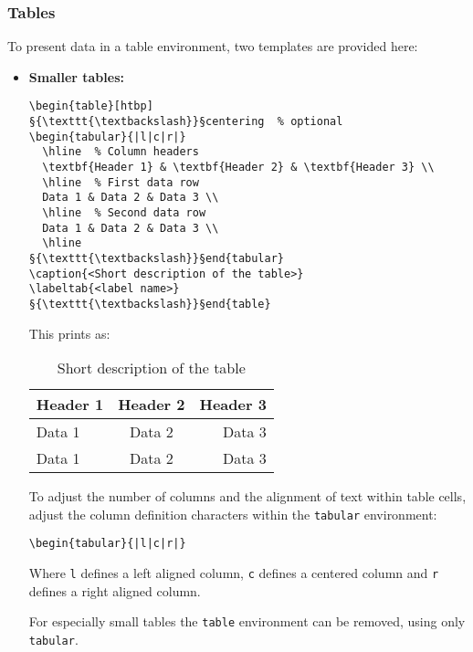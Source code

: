\subsubsection{Tables}

To present data in a table environment, two templates are provided here:

\begin{itemize}
\item \textbf{Smaller tables:}
\begin{lstlisting}[style=LaTeXStyle]
\begin{table}[htbp]
§{\texttt{\textbackslash}}§centering  % optional
\begin{tabular}{|l|c|r|}
  \hline  % Column headers
  \textbf{Header 1} & \textbf{Header 2} & \textbf{Header 3} \\
  \hline  % First data row
  Data 1 & Data 2 & Data 3 \\
  \hline  % Second data row
  Data 1 & Data 2 & Data 3 \\
  \hline
§{\texttt{\textbackslash}}§end{tabular}
\caption{<Short description of the table>}
\labeltab{<label name>}
§{\texttt{\textbackslash}}§end{table}
\end{lstlisting}
This prints as:
\begin{table}[htbp]
\centering  %
\begin{tabular}{|l|c|r|}
  \hline  %
  \textbf{Header 1} & \textbf{Header 2} & \textbf{Header 3} \\
  \hline  %
  Data 1 & Data 2 & Data 3 \\
  \hline  %
  Data 1 & Data 2 & Data 3 \\
  \hline
\end{tabular}
\caption{Short description of the table}
\end{table}

To adjust the number of columns and the alignment of text within table cells, adjust the column definition characters within the \texttt{tabular} environment:
\begin{lstlisting}[style=LaTeXStyle]
\begin{tabular}{|l|c|r|}
\end{lstlisting}
Where \texttt{l} defines a left aligned column, \texttt{c} defines a centered column and \texttt{r} defines a right aligned column.

For especially small tables the \texttt{table} environment can be removed, using only \texttt{tabular}.


\end{itemize}
